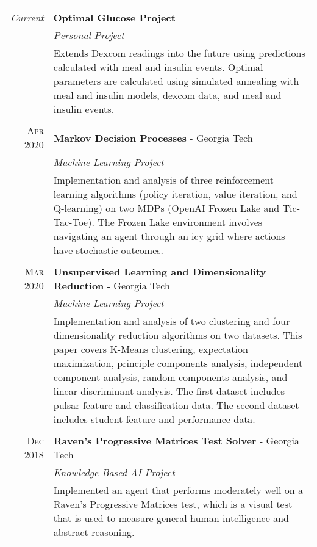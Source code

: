 \documentclass[a4paper,11pt]{article}
\begin{document}
\begin{tabularx}{\textwidth}{R|X}

    \\

   \emph{Current} & \textbf{Optimal Glucose Project} \\
   & \emph{Personal Project}\\
   & \small{Extends Dexcom readings into the future using predictions calculated with meal and insulin events. Optimal parameters are calculated using simulated annealing with meal and insulin models, dexcom data, and meal and insulin events.
   } \\
   
    \\

   \textsc{Apr 2020} & \textbf{Markov Decision Processes} \-- Georgia Tech\\
   & \emph{Machine Learning Project}\\
   & \small{Implementation and analysis of three reinforcement learning algorithms (policy iteration, value iteration, and Q-learning) on two MDPs (OpenAI Frozen Lake and Tic-Tac-Toe). The Frozen Lake environment involves navigating an agent through an icy grid where actions have stochastic outcomes.
   } \\
   
     \\

   \textsc{Mar 2020} & \textbf{Unsupervised Learning and Dimensionality Reduction} \-- Georgia Tech\\
   & \emph{Machine Learning Project}\\
   & \small{Implementation and analysis of two clustering and four dimensionality reduction algorithms on two datasets. This paper covers K-Means clustering, expectation maximization, principle components analysis, independent component analysis, random components analysis, and linear discriminant analysis. The first dataset includes pulsar feature and classification data. The second dataset includes student feature and performance data.
   } \\
   
     \\

   \textsc{Dec 2018} & \textbf{Raven's Progressive Matrices Test Solver} \-- Georgia Tech\\
   & \emph{Knowledge Based AI Project}\\
   & \small{Implemented an agent that performs moderately well on a Raven's Progressive Matrices test, which is a visual test that is used to measure general human intelligence and abstract reasoning.
   } \\
   

\end{tabularx}
\end{document}
